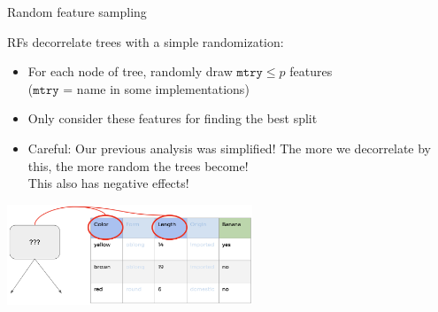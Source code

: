 \documentclass[11pt,compress,t,notes=noshow, xcolor=table]{beamer}
\begin{document}
\begin{frame2}{Random feature sampling}

RFs decorrelate trees with a simple randomization:

\begin{itemize}
  \item For each node of tree, randomly draw $\texttt{mtry} \le p$ features \\
    ($\texttt{mtry}$ = name in some implementations)
  \item Only consider these features for finding the best split
  \item Careful: Our previous analysis was simplified! The more we decorrelate by this,
    the more random the trees become!
    \\This also has negative effects!
\end{itemize}

\begin{center}
\includegraphics[width=0.55\textwidth]{figure_man/forest-feature-sampling.png}
\end{center}



\end{frame2}
\end{document}
